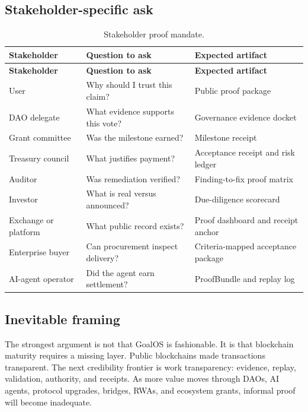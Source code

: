 \documentclass[11pt]{article}
\begin{document}
\subsection{Stakeholder-specific ask}

\begin{longtable}{p{} p{} p{}}
\caption{Stakeholder proof mandate.}\label{tab:stakeholders}\\
\toprule
\textbf{Stakeholder} & \textbf{Question to ask} & \textbf{Expected artifact}\\
\midrule
\endfirsthead
\toprule
\textbf{Stakeholder} & \textbf{Question to ask} & \textbf{Expected artifact}\\
\midrule
\endhead
User & Why should I trust this claim? & Public proof package \\
DAO delegate & What evidence supports this vote? & Governance evidence docket \\
Grant committee & Was the milestone earned? & Milestone receipt \\
Treasury council & What justifies payment? & Acceptance receipt and risk ledger \\
Auditor & Was remediation verified? & Finding-to-fix proof matrix \\
Investor & What is real versus announced? & Due-diligence scorecard \\
Exchange or platform & What public record exists? & Proof dashboard and receipt anchor \\
Enterprise buyer & Can procurement inspect delivery? & Criteria-mapped acceptance package \\
AI-agent operator & Did the agent earn settlement? & ProofBundle and replay log \\
\bottomrule
\end{longtable}

\subsection{Inevitable framing}

The strongest argument is not that GoalOS is fashionable. It is that blockchain maturity requires a missing layer. Public blockchains made transactions transparent. The next credibility frontier is work transparency: evidence, replay, validation, authority, and receipts. As more value moves through DAOs, AI agents, protocol upgrades, bridges, RWAs, and ecosystem grants, informal proof will become inadequate.
\end{document}
